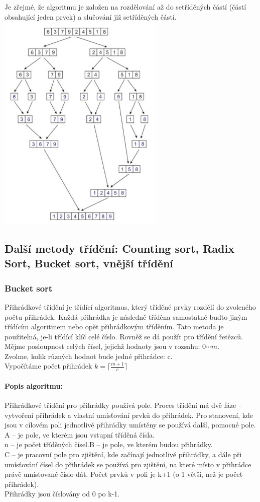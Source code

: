 \documentclass[10pt,a4paper]{article}
\begin{document}
Je zřejmé, že algoritmu je založen na rozdělování až do setříděných částí (částí obsahující jeden prvek) a slučování již setříděných částí. \\
\includegraphics[width=8cm]{img/merge.jpg}

\subsection{Další metody třídění: Counting sort, Radix Sort, Bucket sort, vnější třídění}
\subsubsection{Bucket sort}
Přihrádkové třídění je třídící algoritmus, který tříděné prvky rozdělí do zvoleného počtu přihrádek. Každá přihrádka je následně tříděna samostatně buďto jiným třídícím algoritmem nebo opět přihrádkovým tříděním. Tato metoda je použitelná, je-li třídící klíč celé číslo. Rovněž se dá použít pro třídění řetězců. \\
Mějme posloupnost celých čísel, jejichž hodnoty jsou v rozsahu: $0 \cdots m$. \\
Zvolme, kolik různých hodnot bude jedné přihrádce: c. \\
Vypočítáme počet přihrádek $k = \lceil \frac{m+1}{c} \rceil$ \\
\paragraph{Popis algoritmu:}
Přihrádkové třídění pro přihrádky používá pole. Proces třídění má dvě fáze – vytvoření přihrádek a vlastní umísťování prvků do přihrádek. Pro stanovení, kde jsou v cílovém poli jednotlivé přihrádky umístěny se používá další, pomocné pole. \\
A – je pole, ve kterém jsou vstupní tříděná čísla. \\
n – je počet tříděných čísel.B – je pole, ve kterém budou přihrádky. \\
C – je pracovní pole pro zjištění, kde začínají jednotlivé přihrádky, a dále při umísťování čísel do přihrádek se používá pro zjištění, na které místo v přihrádce právě umísťované číslo dát. Počet prvků v poli je k+1 (o 1 větší, než je počet přihrádek). \\
Přihrádky jsou číslovány od 0 po k-1.
\end{document}
